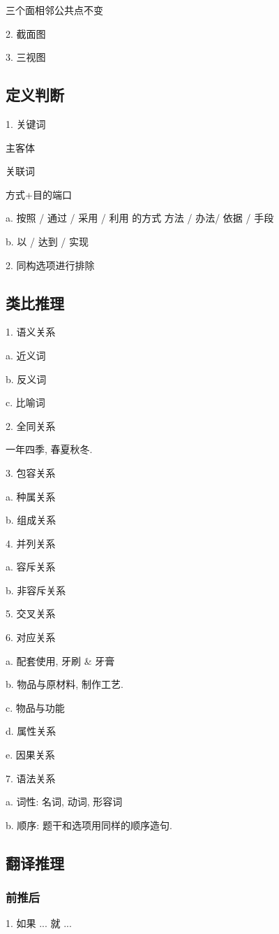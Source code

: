 \documentclass[UTF8]{ctexart}
\begin{document}
三个面相邻公共点不变

2. 截面图


3. 三视图

\subsection{定义判断}
1. 关键词

主客体

关联词

方式+目的端口

a. 按照 / 通过 / 采用 / 利用 的方式 方法 / 办法/ 依据 / 手段

b. 以 / 达到 / 实现

2. 同构选项进行排除

\subsection{类比推理}
1. 语义关系

a. 近义词

b. 反义词

c.  比喻词

2. 全同关系

一年四季, 春夏秋冬.

3. 包容关系

a. 种属关系

b. 组成关系

4. 并列关系

a. 容斥关系

b. 非容斥关系

5. 交叉关系

6. 对应关系

a. 配套使用, 牙刷 \& 牙膏

b. 物品与原材料, 制作工艺.

c. 物品与功能

d. 属性关系

e. 因果关系

7. 语法关系

a. 词性: 名词, 动词, 形容词

b. 顺序: 题干和选项用同样的顺序造句.

\subsection{翻译推理}

\subsubsection{前推后}
1. 如果 ... 就 ...
\end{document}
